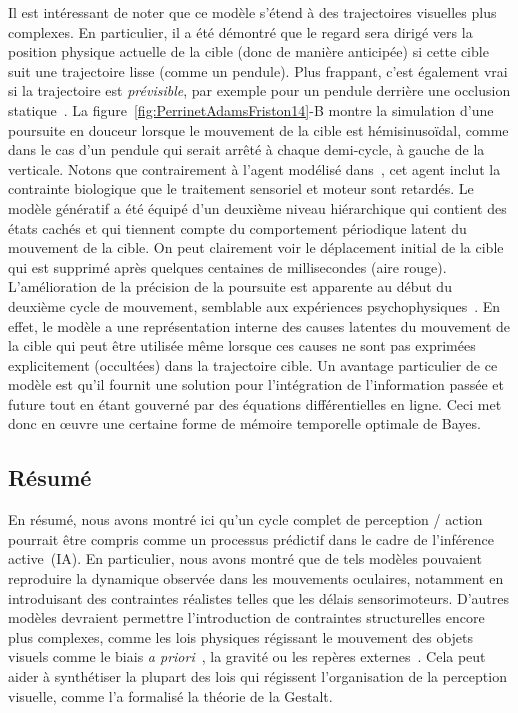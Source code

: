 \documentclass[11pt,french,a4paper,oneside]{article}%
\begin{document}
Il est intéressant de noter que ce modèle s'étend à des trajectoires
visuelles plus complexes. En particulier, il a été démontré que le
regard sera dirigé vers la position physique actuelle de la cible (donc
de manière anticipée) si cette cible suit une trajectoire lisse
(comme un pendule). Plus frappant, c'est également vrai si la
trajectoire est \emph{prévisible}, par exemple pour un pendule derrière
une occlusion statique~\citep{Barnes91,Adams12}. La figure~\ref{fig:PerrinetAdamsFriston14}-B montre la simulation d'une poursuite
en douceur lorsque le mouvement de la cible est hémisinusoïdal, comme
dans le cas d'un pendule qui serait arrêté à chaque demi-cycle, à gauche
de la verticale. Notons que contrairement à l'agent modélisé dans~\citep{Adams12}, cet agent inclut la contrainte biologique
que le traitement sensoriel et moteur sont retardés. Le modèle génératif a
été équipé d'un deuxième niveau hiérarchique qui contient des états
cachés et qui tiennent compte du comportement périodique latent du
mouvement de la cible. On peut clairement voir le déplacement initial de
la cible qui est supprimé après quelques centaines de millisecondes
(aire rouge). L'amélioration de la précision de la poursuite
est apparente au début du deuxième cycle de mouvement, semblable aux
expériences psychophysiques~\citep{Barnes91}. En effet, le
modèle a une représentation interne des causes latentes du mouvement de
la cible qui peut être utilisée même lorsque ces causes ne sont pas
exprimées explicitement (occultées) dans la trajectoire cible. Un
avantage particulier de ce modèle est qu'il fournit une solution pour
l'intégration de l'information passée et future tout en étant gouverné
par des équations différentielles en ligne. Ceci met donc en œuvre une
certaine forme de mémoire temporelle optimale de Bayes.

\subsection{Résumé}
En résumé, nous avons montré ici qu'un cycle complet de perception
/ action pourrait être compris comme un processus prédictif
dans le cadre de l'inférence active~(IA). En particulier, nous avons
montré que de tels modèles pouvaient reproduire la dynamique observée
dans les mouvements oculaires, notamment en introduisant des contraintes
réalistes telles que les délais sensorimoteurs. D'autres modèles
devraient permettre l'introduction de contraintes structurelles encore
plus complexes, comme les lois physiques régissant le mouvement des
objets visuels comme le biais \emph{a priori}~\citep{Damasse18}, la
gravité ou les repères externes~\citep{Kowler14}. Cela peut aider à
synthétiser la plupart des lois qui régissent l'organisation de la
perception visuelle, comme l'a formalisé la théorie de la Gestalt.
\end{document}

